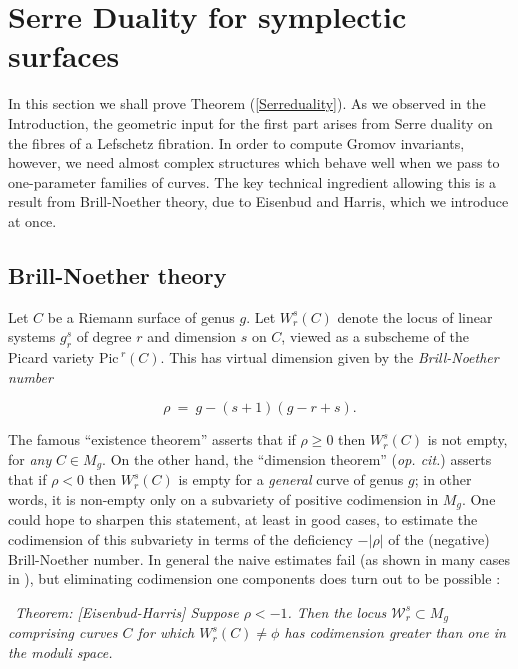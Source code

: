 \documentclass[10pt]{article}
\newcommand{\Pic}{\mathrm{Pic \,}}
\newcounter{Universal}[section]
\renewcommand{\theUniversal}{\thesection.\arabic{Universal}}
\newenvironment{Italic}{\refstepcounter{Universal} \par \vspace{0.5cm}
\noindent {\bf (\theUniversal)}\ \it}{\par \vspace{0.5cm}}
\newenvironment{Thm}{\begin{Italic}{\sc Theorem: }}{\end{Italic}}
\begin{document}

\section{Serre Duality for symplectic surfaces}

In this section we shall prove Theorem
(\ref{Serreduality}).  As we observed in the Introduction, the
geometric input for the first part arises from Serre duality on the
fibres of a Lefschetz 
fibration.  In order to compute Gromov invariants, however, we need
almost complex structures which behave well when we pass to
one-parameter families of curves.  The key
technical ingredient allowing this is a result from Brill-Noether
theory, due to Eisenbud and Harris, which we introduce at once.  


\subsection{Brill-Noether theory}

Let $C$ be a Riemann surface of genus $g$.
Let $W^s_r(C)$ denote the locus of linear systems
$g^s_r$ of degree $r$ and dimension $s$ on $C$, viewed as a subscheme
of the Picard variety $\Pic^r(C)$.  This has virtual dimension
given by the \emph{Brill-Noether number}

$$\rho  \ = \ g-(s+1)(g-r+s).$$

\noindent The famous ``existence theorem'' \cite{ACGH} asserts that if
$\rho \geq 0$ then $W^s_r(C)$ is not empty, for \emph{any} $C \in
M_g$.  On the other hand, the ``dimension theorem'' (\emph{op. cit.})
asserts that if $\rho < 0$ then $W^s_r(C)$ is empty for a
\emph{general} curve of genus $g$; in other words, it is non-empty
only on a subvariety of positive codimension in $M_g$.  One could hope to
sharpen this statement, at least in good cases, to estimate the
codimension of this subvariety in terms of the deficiency $-|\rho|$ of the
(negative) Brill-Noether number.  In general the naive estimates fail (as shown
in many cases in \cite{ACGH}), but eliminating codimension one
components does turn out to be possible \cite{EH}:

\begin{Thm}[Eisenbud-Harris] \label{EHresult}
Suppose $\rho < -1$.  Then the locus $\mathcal{W}^s_r \subset M_g$
comprising curves $C$ for which $W^s_r (C) \neq \phi$ has codimension
greater than one in the moduli space.
\end{Thm}
\end{document}
